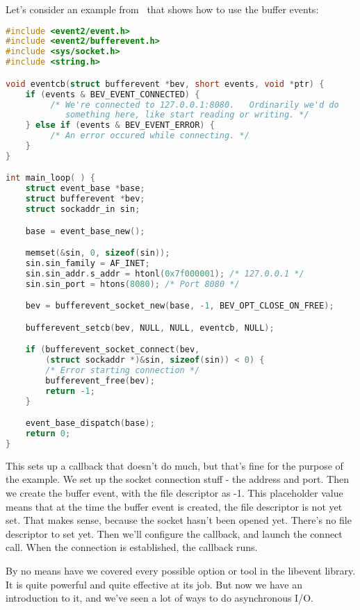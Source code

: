 Let's consider an example from~\cite{libevent} that shows how to use the buffer events:
\begin{lstlisting}[language=C]
#include <event2/event.h>
#include <event2/bufferevent.h>
#include <sys/socket.h>
#include <string.h>

void eventcb(struct bufferevent *bev, short events, void *ptr) {
    if (events & BEV_EVENT_CONNECTED) {
         /* We're connected to 127.0.0.1:8080.   Ordinarily we'd do
            something here, like start reading or writing. */
    } else if (events & BEV_EVENT_ERROR) {
         /* An error occured while connecting. */
    }
}

int main_loop( ) {
    struct event_base *base;
    struct bufferevent *bev;
    struct sockaddr_in sin;

    base = event_base_new();

    memset(&sin, 0, sizeof(sin));
    sin.sin_family = AF_INET;
    sin.sin_addr.s_addr = htonl(0x7f000001); /* 127.0.0.1 */
    sin.sin_port = htons(8080); /* Port 8080 */

    bev = bufferevent_socket_new(base, -1, BEV_OPT_CLOSE_ON_FREE);

    bufferevent_setcb(bev, NULL, NULL, eventcb, NULL);

    if (bufferevent_socket_connect(bev,
        (struct sockaddr *)&sin, sizeof(sin)) < 0) {
        /* Error starting connection */
        bufferevent_free(bev);
        return -1;
    }

    event_base_dispatch(base);
    return 0;
}
\end{lstlisting}

This sets up a callback that doesn't do much, but that's fine for the purpose of the example. We set up the socket connection stuff - the address and port. Then we create the buffer event, with the file descriptor as -1. This placeholder value means that at the time the buffer event is created, the file descriptor is not yet set. That makes sense, because the socket hasn't been opened yet. There's no file descriptor to set yet. Then we'll configure the callback, and launch the connect call. When the connection is established, the callback runs.

By no means have we covered every possible option or tool in the libevent library. It is quite powerful and quite effective at its job. But now we have an introduction to it, and we've seen a lot of ways to do asynchronous I/O.




